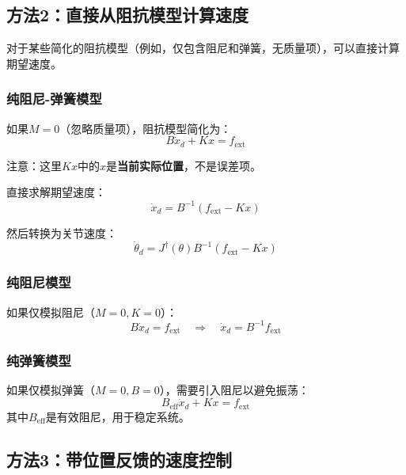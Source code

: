 \documentclass[12pt,a4paper]{article}
\begin{document}
\subsection{方法2：直接从阻抗模型计算速度}

对于某些简化的阻抗模型（例如，仅包含阻尼和弹簧，无质量项），可以直接计算期望速度。

\subsubsection{纯阻尼-弹簧模型}

如果$M = 0$（忽略质量项），阻抗模型简化为：
\begin{equation}
B\dot{x}_d + Kx = f_{\text{ext}}
\end{equation}

注意：这里$Kx$中的$x$是\textbf{当前实际位置}，不是误差项。

直接求解期望速度：
\begin{equation}
\dot{x}_d = B^{-1}(f_{\text{ext}} - Kx)
\end{equation}

然后转换为关节速度：
\begin{equation}
\dot{\theta}_d = J^{\dagger}(\theta) B^{-1}(f_{\text{ext}} - Kx)
\end{equation}

\subsubsection{纯阻尼模型}

如果仅模拟阻尼（$M = 0, K = 0$）：
\begin{equation}
B\dot{x}_d = f_{\text{ext}} \quad \Rightarrow \quad \dot{x}_d = B^{-1}f_{\text{ext}}
\end{equation}

\subsubsection{纯弹簧模型}

如果仅模拟弹簧（$M = 0, B = 0$），需要引入阻尼以避免振荡：
\begin{equation}
B_{\text{eff}}\dot{x}_d + Kx = f_{\text{ext}}
\end{equation}
其中$B_{\text{eff}}$是有效阻尼，用于稳定系统。

\subsection{方法3：带位置反馈的速度控制}
\end{document}
